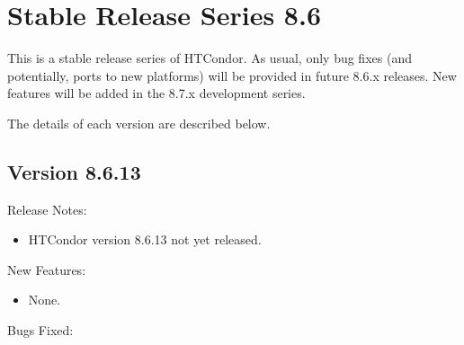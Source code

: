 
\section{Stable Release Series 8.6}\label{sec:History-8-6}

This is a stable release series of HTCondor.
As usual, only bug fixes (and potentially, ports to new platforms)
will be provided in future 8.6.x releases.
New features will be added in the 8.7.x development series.

The details of each version are described below.

\subsection*{\label{sec:New-8-6-13}Version 8.6.13}

\noindent Release Notes:

\begin{itemize}

\item HTCondor version 8.6.13 not yet released.

\end{itemize}


\noindent New Features:

\begin{itemize}

\item None.

\end{itemize}

\noindent Bugs Fixed:

